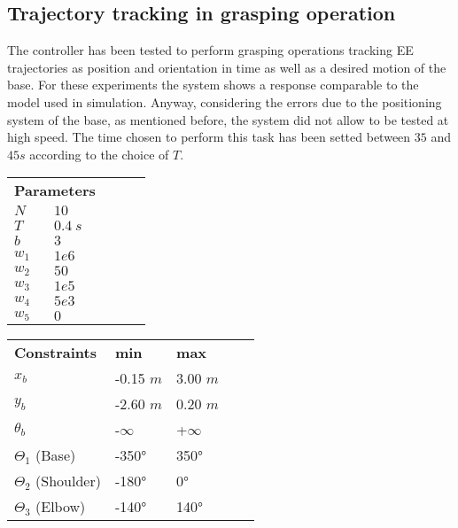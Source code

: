 \subsection{Trajectory tracking in grasping operation}

The controller has been tested to perform grasping operations tracking EE trajectories as position and orientation in time as well as a desired motion of the base. For these experiments the system shows a response comparable to the model used in simulation. Anyway, considering the errors due to the positioning system of the base, as mentioned before, the system did not allow to be tested at high speed. The time chosen to perform this task has been setted between $35$ and $45 s$ according to the choice of $T$. 

	\begin{table}[]
	\centering
	\begin{tabular}{|l|l|l|ll}
	\cline{1-2}
	\multicolumn{2}{|l|}{ \textbf{Parameters} }	\\ \cline{1-2}
	$N$     				&  $10$ 	      					\\ \cline{1-2}
	$T$     				&  $0.4\ s$  	      					\\ \cline{1-2}
	$b$     				&  $3$ 	      						\\ \cline{1-2}
	$w_1$    				&  $1e6$       						\\ \cline{1-2}
	$w_2$    				&  $50$       						\\ \cline{1-2}
	$w_3$    				&  $1e5$       						\\ \cline{1-2}
	$w_4$    				&  $5e3$       						\\ \cline{1-2}
	$w_5$    				&  $0$      						\\ \cline{1-2}
	\end{tabular}
	\quad
	\begin{tabular}{|l|l|l|ll}
	\cline{1-3}
	\textbf{Constraints}    	& \textbf{min} 					& \textbf{max}			\\ \cline{1-3}
	$x_b$		 			 		&  -0.15 $m$ 					&  3.00 $m$ 			\\ \cline{1-3}
	$y_b$		 			 		&  -2.60 $m$ 					&  0.20 $m$ 			\\ \cline{1-3}
	$\theta_b$ 			 		&  -$\infty$  					&  +$\infty$ 			\\ \cline{1-3}
	$\Theta_1$ (Base)			&  -350°  						&  350° 				\\ \cline{1-3}
	$\Theta_2$ (Shoulder)		&  -180° 						&  0°		 			\\ \cline{1-3}
	$\Theta_3$ (Elbow) 			&  -140° 						&  140°		 			\\ \cline{1-3}

\end{tabular}
\end{table}
